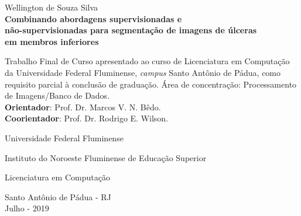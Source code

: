 \blankpage
\vspace{1.5cm}

\begin{center}
    \large{Wellington de Souza Silva}\\
    \vspace{3cm}
    {\Large{\textbf{
            Combinando abordagens supervisionadas e \\[0.2cm] 
            não-supervisionadas para segmentação de imagens de úlceras \\[0.2cm]
            em membros inferiores
        }}
    }
    \vspace{3cm}

    \begin{flushright}
        \begin{minipage}[l]{7.5cm}
            {\small{
                Trabalho Final de Curso apresentado ao curso de Licenciatura em Computação da Universidade Federal Fluminense, \textit{campus} Santo Antônio de Pádua, como requisito parcial à conclusão de graduação.
                Área de concentração: Processamento de Imagens/Banco de Dados. 
                \\[0.2cm]
                \textbf{Orientador}: Prof. Dr. Marcos V. N. Bêdo. \\
                \textbf{Coorientador}: Prof. Dr. Rodrigo E. Wilson.
            }}
        \end{minipage}
    \end{flushright}

    \vspace{1cm}

    \begin{center}
        {\small{
            Universidade Federal Fluminense
            \par
            Instituto do Noroeste Fluminense de Educação Superior
            \par
            Licenciatura em Computação
        }}
    \end{center}

    \vspace{3cm}

    \begin{center}
        {\large Santo Antônio de Pádua - RJ}\\[0.2cm]
        {\large Julho - 2019}
    \end{center}
\end{center}
